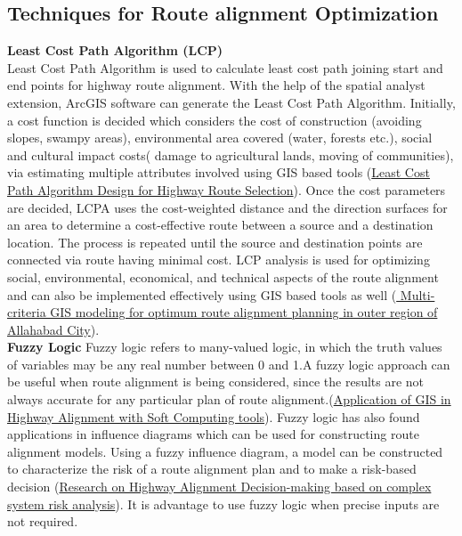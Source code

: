 \subsection{Techniques for Route alignment Optimization }
\textbf{Least Cost Path Algorithm (LCP)}\\Least Cost Path Algorithm is used to calculate least cost path joining start and end points for highway route alignment. With the help of the spatial analyst extension, ArcGIS software can generate the Least Cost Path Algorithm. Initially, a cost function is decided which considers the cost of construction (avoiding slopes, swampy areas), environmental area covered (water, forests etc.), social and cultural impact costs( damage to agricultural lands, moving of communities), via estimating multiple attributes involved using GIS based tools (\href{https://www.researchgate.net/publication/320005801_LEAST_COST_PATH_ALGORITHM_DESIGN_FOR_HIGHWAY_ROUTE_SELECTION}{Least Cost Path Algorithm Design for Highway Route Selection}). Once the cost parameters are decided, LCPA uses the cost-weighted distance and the direction surfaces for an area to determine a cost-effective route between a source and a destination location. The process is repeated until the source and destination points are connected via route having minimal cost. LCP analysis is used for optimizing social, environmental, economical, and technical aspects of the route alignment and can also be implemented effectively using GIS based tools as well (\href{https://link.springer.com/article/10.1007/s12517-017-3076-z}{ Multi-criteria GIS modeling for optimum route alignment planning in outer region of Allahabad City}).\\
\textbf{Fuzzy Logic}
Fuzzy logic refers to many-valued logic, in which the truth values of variables may be any real number between 0 and 1.A fuzzy logic approach can be useful when route alignment is being considered, since the results are not always accurate for any particular plan of route alignment.(\href{https://ieeexplore.ieee.org/document/6675923
}{Application of GIS in Highway Alignment with Soft Computing tools}). Fuzzy logic has also found applications in influence diagrams which can be used for constructing route alignment models. Using a fuzzy influence diagram, a model can be constructed to characterize the risk of a route alignment plan and to make a risk-based decision (\href{https://ieeexplore.ieee.org/document/6414422}{Research on Highway Alignment Decision-making based on complex system risk analysis}). It is advantage to use fuzzy logic when precise inputs are not required. \\

